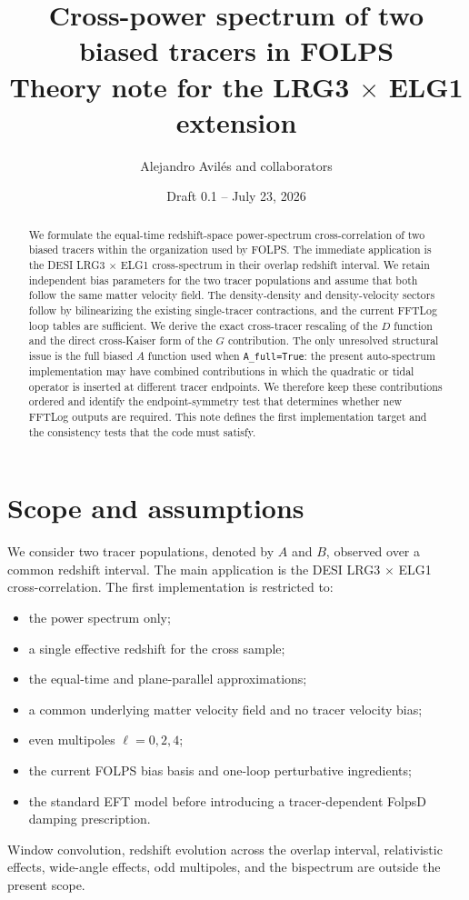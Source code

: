 \documentclass[11pt,a4paper]{article}
\title{Cross-power spectrum of two biased tracers in FOLPS\\
\large Theory note for the LRG3 $\times$ ELG1 extension}
\author{Alejandro Avil\'es and collaborators}
\date{Draft 0.1 -- July 23, 2026}
\begin{document}
\maketitle

\begin{abstract}
We formulate the equal-time redshift-space power-spectrum cross-correlation of two biased tracers within the organization used by FOLPS. The immediate application is the DESI LRG3 $\times$ ELG1 cross-spectrum in their overlap redshift interval. We retain independent bias parameters for the two tracer populations and assume that both follow the same matter velocity field. The density-density and density-velocity sectors follow by bilinearizing the existing single-tracer contractions, and the current FFTLog loop tables are sufficient. We derive the exact cross-tracer rescaling of the $D$ function and the direct cross-Kaiser form of the $G$ contribution. The only unresolved structural issue is the full biased $A$ function used when \texttt{A\_full=True}: the present auto-spectrum implementation may have combined contributions in which the quadratic or tidal operator is inserted at different tracer endpoints. We therefore keep these contributions ordered and identify the endpoint-symmetry test that determines whether new FFTLog outputs are required. This note defines the first implementation target and the consistency tests that the code must satisfy.
\end{abstract}

\tableofcontents

\section{Scope and assumptions}
\label{sec:scope}

We consider two tracer populations, denoted by $A$ and $B$, observed over a common redshift interval. The main application is the DESI LRG3 $\times$ ELG1 cross-correlation. The first implementation is restricted to:
\begin{itemize}[leftmargin=1.5em]
    \item the power spectrum only;
    \item a single effective redshift for the cross sample;
    \item the equal-time and plane-parallel approximations;
    \item a common underlying matter velocity field and no tracer velocity bias;
    \item even multipoles $\ell=0,2,4$;
    \item the current FOLPS bias basis and one-loop perturbative ingredients;
    \item the standard EFT model before introducing a tracer-dependent FolpsD damping prescription.
\end{itemize}
Window convolution, redshift evolution across the overlap interval, relativistic effects, wide-angle effects, odd multipoles, and the bispectrum are outside the present scope.
\end{document}
